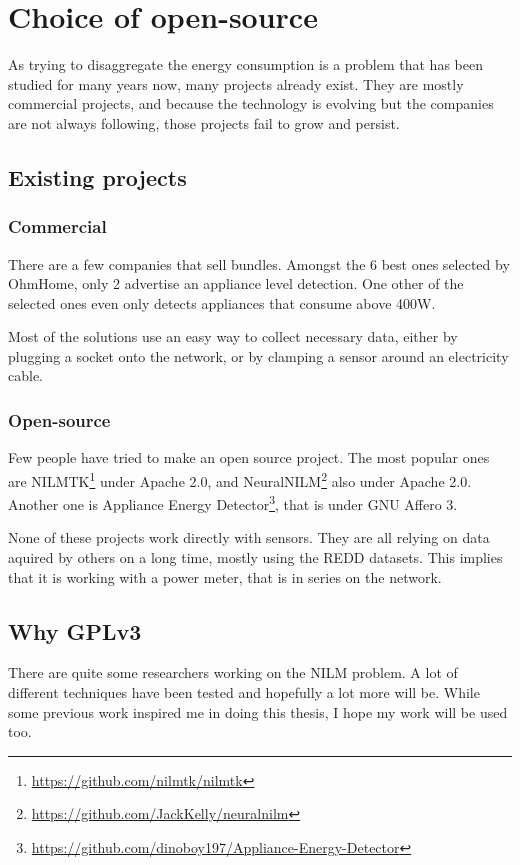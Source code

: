 \chapter{Choice of open-source}
As trying to disaggregate the energy consumption is a problem that has been studied for many years now, many projects already exist. They are mostly commercial projects, and because the technology is evolving but the companies are not always following, those projects fail to grow and persist.

\section{Existing projects}
\subsection{Commercial}
There are a few companies that sell bundles. Amongst the 6 best ones selected by OhmHome\cite{opensourcelist}, only 2 advertise an appliance level detection. One other of the selected ones even only detects appliances that consume above 400W.

Most of the solutions use an easy way to collect necessary data, either by plugging a socket onto the network, or by clamping a sensor around an electricity cable.
\subsection{Open-source}
Few people have tried to make an open source project. The most popular ones are NILMTK\footnote{\url{https://github.com/nilmtk/nilmtk}}\cite{batra2014nilmtk} under Apache 2.0, and NeuralNILM\footnote{\url{https://github.com/JackKelly/neuralnilm}}\cite{kelly2015neural} also under Apache 2.0. Another one is Appliance Energy Detector\footnote{\url{https://github.com/dinoboy197/Appliance-Energy-Detector}}, that is under GNU Affero 3.

None of these projects work directly with sensors. They are all relying on data aquired by others on a long time, mostly using the REDD datasets. This implies that it is working with a power meter, that is in series on the network.
\section{Why GPLv3}
There are quite some researchers working on the NILM problem. A lot of different techniques have been tested and hopefully a lot more will be. While some previous work inspired me in doing this thesis, I hope my work will be used too.

